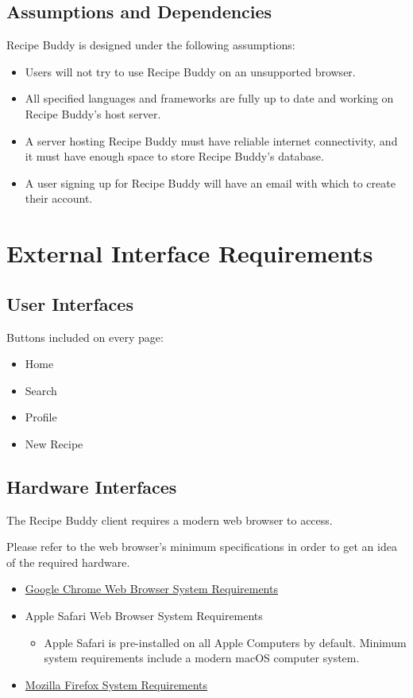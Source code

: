 \documentclass{scrreprt}
\begin{document}
\section{Assumptions and Dependencies}
\gls{Recipe Buddy} is designed under the following assumptions:
\begin{itemize}
    \item Users will not try to use \gls{Recipe Buddy} on an unsupported browser.
    \item All specified languages and frameworks are fully up to date and working on \gls{Recipe Buddy}'s host server.
    \item A server hosting \gls{Recipe Buddy} must have reliable internet connectivity, and it must have enough space to store \gls{Recipe Buddy}'s database.
    \item A user signing up for \gls{Recipe Buddy} will have an email with which to create their account.
\end{itemize}

\chapter{External Interface Requirements}

\section{User Interfaces}
Buttons included on every page:
\begin{itemize}
    \item Home
    \item Search
    \item Profile
    \item New Recipe
\end{itemize}

\section{Hardware Interfaces}
The Recipe Buddy client requires a modern web browser to access.

Please refer to the web browser's minimum specifications in order to get an idea of the required hardware.

\begin{itemize}
    \item \href{https://support.google.com/chrome/a/answer/7100626?hl=en}{Google Chrome Web Browser System Requirements}
    \item Apple Safari Web Browser System Requirements
          \begin{itemize}
              \item Apple Safari is pre-installed on all Apple Computers by default. Minimum system requirements include a modern macOS computer system.
          \end{itemize}
    \item \href{https://www.mozilla.org/en-US/firefox/92.0.1/system-requirements/}{Mozilla Firefox System Requirements}
\end{itemize}
\end{document}
